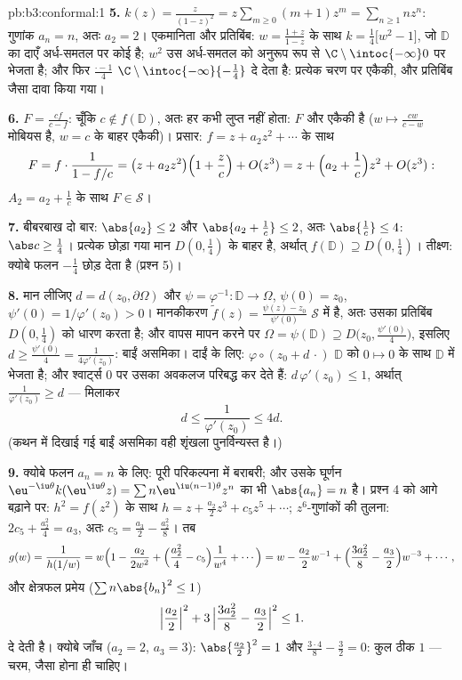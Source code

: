 \begin{solution}{pb:b3:conformal:1}
\textbf{5.} $k(z) = \frac z{(1-z)^2} = z\sum_{m\geq0}(m +
1)z^m = \sum_{n\geq1}nz^n$: गुणांक $a_n = n$, अतः $a_2 =
2$। एकमानिता और प्रतिबिंब:
$w = \frac{1 + z}{1 - z}$ के साथ $k = \frac14\bigl[w^2 - 1\bigr]$, जो $\mathbb D$ का दाएँ अर्ध-समतल पर कोई 
है; $w^2$ उस अर्ध-समतल को अनुरूप रूप से $\C\setminus\intoc{-\infty}0$ पर भेजता है; और फिर
$\frac{\cdot - 1}4$ $\C\setminus\intoc{-\infty}{-\frac14}$ दे देता है: प्रत्येक चरण पर एकैकी, और प्रतिबिंब जैसा दावा
किया गया।

\textbf{6.} $F = \frac{cf}{c - f}$: चूँकि $c \notin f(\mathbb
D)$, अतः हर कभी लुप्त नहीं होता: $F$
 और एकैकी है ($w \mapsto \frac{cw}{c - w}$ मोबियस है, $w = c$ के बाहर एकैकी)।
प्रसार: $f = z + a_2z^2 + \cdots$ के साथ
\[
F = f\cdot\frac1{1 - f/c} = \bigl(z + a_2z^2\bigr)\Bigl(1 +
\frac zc\Bigr) + O(z^3)
= z + \Bigl(a_2 + \frac1c\Bigr)z^2 + O(z^3):
\]
$A_2 = a_2 + \frac1c$ के साथ $F \in \mathcal S$।

\textbf{7.} बीबरबाख दो बार: $\abs{a_2} \leq 2$ और $\abs{a_2 + \frac1c} \leq 2$, अतः $\abs{\frac1c} \leq 4$: $\abs c \geq \frac14$। प्रत्येक
छोड़ा गया मान $D(0,\frac14)$ के बाहर है, अर्थात् $f(\mathbb D) \supseteq D(0, \frac14)$। तीक्ष्ण: क्योबे फलन
$-\frac14$ छोड़ देता है (प्रश्न 5)।

\textbf{8.} मान लीजिए $d = d(z_0, \partial\Omega)$ और $\psi =
\varphi^{-1} \colon \mathbb D \to \Omega$, $\psi(0) = z_0$, $\psi'(0) = 1/\varphi'(z_0) > 0$। मानकीकरण $\tilde
f(z) = \frac{\psi(z) - z_0}{\psi'(0)}$
$\mathcal S$ में है, अतः उसका प्रतिबिंब $D(0, \frac14)$ को धारण करता है; और वापस मापन
करने पर $\Omega = \psi(\mathbb D) \supseteq D\bigl(z_0,
\tfrac{\psi'(0)}4\bigr)$, इसलिए $d \geq \frac{\psi'(0)}4 =
\frac1{4\varphi'(z_0)}$: बाईं असमिका। दाईं के लिए: $\varphi\circ(z_0 + d\,\cdot)$ $\mathbb D$
को $0 \mapsto 0$ के साथ $\mathbb D$ में भेजता है; और श्वार्ट्स $0$ पर उसका अवकलज
परिबद्ध कर देते हैं: $d\,\varphi'(z_0) \leq 1$, अर्थात् $\frac1{\varphi'(z_0)} \geq d$ --- मिलाकर
\[
d \leq \frac1{\varphi'(z_0)} \leq 4d .
\]
(कथन में दिखाई गई बाईं असमिका वही शृंखला पुनर्विन्यस्त है।)

\textbf{9.} क्योबे फलन $a_n = n$ के लिए: पूरी परिकल्पना में बराबरी; और
उसके घूर्णन $\eu^{-\iu\theta}k(\eu^{\iu\theta}z) = \sum
n\eu^{\iu(n-1)\theta}z^n$ का भी $\abs{a_n} = n$ है। प्रश्न 4 को आगे बढ़ाने पर: $h^2 = f(z^2)$
के साथ $h = z + \frac{a_2}2z^3 + c_5z^5 + \cdots$; $z^6$-गुणांकों की तुलना: $2c_5 +
\frac{a_2^2}4 = a_3$, अतः $c_5 = \frac{a_3}2 -
\frac{a_2^2}8$। तब
\[
g(w) = \frac1{h(1/w)} = w\Bigl(1 - \frac{a_2}{2w^2} +
\Bigl(\frac{a_2^2}4 - c_5\Bigr)\frac1{w^4} + \cdots\Bigr)
= w - \frac{a_2}2w^{-1} + \Bigl(\frac{3a_2^2}8 -
\frac{a_3}2\Bigr)w^{-3} + \cdots,
\]
और क्षेत्रफल प्रमेय ($\sum n\abs{b_n}^2 \leq 1$)
\[
\Bigl|\frac{a_2}2\Bigr|^2 + 3\,\Bigl|\frac{3a_2^2}8 -
\frac{a_3}2\Bigr|^2 \leq 1 .
\]
दे देती है। क्योबे जाँच ($a_2 = 2$, $a_3 = 3$): $\abs{\frac{a_2}2}^2 = 1$ और $\frac{3\cdot4}8 - \frac32 = 0$: कुल ठीक $1$
--- चरम, जैसा होना ही चाहिए।


\end{solution}
